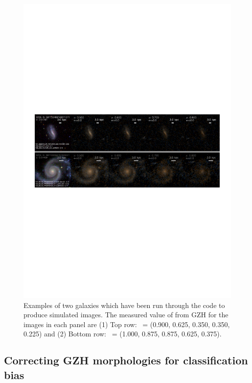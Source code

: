 \documentclass[twocolumn]{aastex6}
\begin{document}
\begin{figure}
\center
\includegraphics[width=160mm]{figures/example_ferengi.pdf}
\caption{Examples of two galaxies which have been run through the \ferengi{} code to produce simulated \hst{} images. The measured value of \ffeatures{} from GZH for the images in each panel are (1) Top row: \ffeatures~= (0.900, 0.625, 0.350, 0.350, 0.225) and (2) Bottom row: \ffeatures~= (1.000, 0.875, 0.875, 0.625, 0.375). \label{fig:exampleFERENGI}}
\end{figure}

\subsection{Correcting GZH morphologies for classification bias}\label{ssec:zeta}
\end{document}

